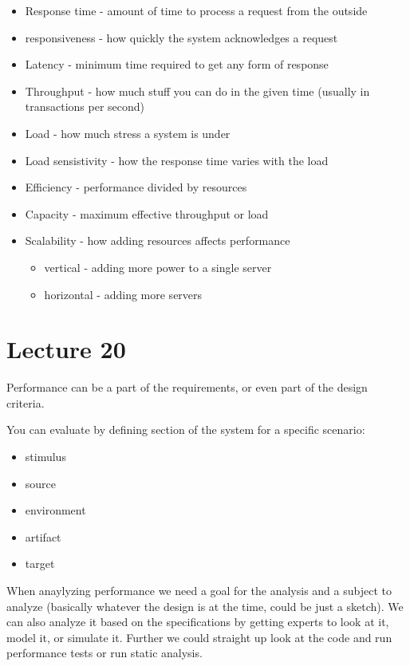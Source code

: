 \documentclass{article}
\begin{document}
\begin{itemize}
    \item Response time - amount of time to process a request from the outside
    \item responsiveness - how quickly the system acknowledges a request
    \item Latency - minimum time required to get any form of response
    \item Throughput - how much stuff you can do in the given time (usually in transactions per second)
    \item Load - how much stress a system is under
    \item Load sensistivity - how the response time varies with the load
    \item Efficiency - performance divided by resources
    \item Capacity - maximum effective throughput or load
    \item Scalability - how adding resources affects performance
    \begin{itemize}
        \item vertical - adding more power to a single server
        \item horizontal - adding more servers
    \end{itemize}
\end{itemize}

\section*{Lecture 20} %
\label{sec:lecture_20}
Performance can be a part of the requirements, or even part of the design criteria.

You can evaluate by defining section of the system for a specific scenario:
\begin{itemize}
    \item stimulus
    \item source
    \item environment
    \item artifact
    \item target
\end{itemize}

When anaylyzing performance we need a goal for the analysis and a subject to analyze (basically whatever the design is at the time, could be just a sketch). We can also analyze it based on the specifications by getting experts to look at it, model it, or simulate it. Further we could straight up look at the code and run performance tests or run static analysis.
\end{document}
